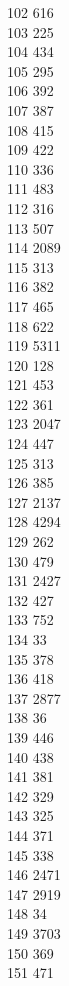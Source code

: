 { 102	616 \\
 103	225 \\
 104	434 \\
 105	295 \\
 106	392 \\
 107	387 \\
 108	415 \\
 109	422 \\
 110	336 \\
 111	483 \\
 112	316 \\
 113	507 \\
 114	2089 \\
 115	313 \\
 116	382 \\
 117	465 \\
 118	622 \\
 119	5311 \\
 120	128 \\
 121	453 \\
 122	361 \\
 123	2047 \\
 124	447 \\
 125	313 \\
 126	385 \\
 127	2137 \\
 128	4294 \\
 129	262 \\
 130	479 \\
 131	2427 \\
 132	427 \\
 133	752 \\
 134	33 \\
 135	378 \\
 136	418 \\
 137	2877 \\
 138	36 \\
 139	446 \\
 140	438 \\
 141	381 \\
 142	329 \\
 143	325 \\
 144	371 \\
 145	338 \\
 146	2471 \\
 147	2919 \\
 148	34 \\
 149	3703 \\
 150	369 \\
 151	471 \\
}
